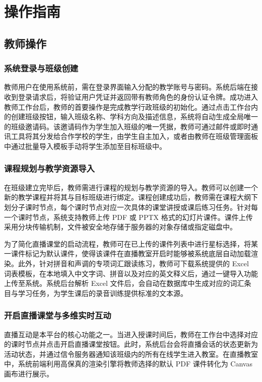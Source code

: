 \chapter{操作指南}

\section{教师操作}

\subsection{系统登录与班级创建}

教师用户在使用系统前，需在登录界面输入分配的教学账号与密码。系统后端在接收到登录请求后，将验证用户凭证并返回带有教师角色的身份认证令牌。成功进入教师工作台后，教师的首要操作是完成教学行政班级的初始化。通过点击工作台内的创建班级按钮，输入班级名称、学科方向及描述信息，系统将自动生成全局唯一的班级邀请码。该邀请码作为学生加入班级的唯一凭据，教师可通过邮件或即时通讯工具将其分发给合作学校的学生，由学生自主加入，或者由教师在班级管理面板中通过批量导入模板手动将学生添加至目标班级中。

\subsection{课程规划与教学资源导入}

在班级建立完毕后，教师需进行课程的规划与教学资源的导入。教师可以创建一个新的教学课程并将其与目标班级进行绑定。课程创建成功后，教师需在课程大纲下划分子课时节点，每个课时节点对应一次具体的课堂讲授或课后练习任务。针对每一个课时节点，系统支持教师上传 PDF 或 PPTX 格式的幻灯片课件。课件上传采用分块传输机制，文件被安全地存储于服务器的对象存储或指定磁盘中。

为了简化直播课堂的启动流程，教师可在已上传的课件列表中进行星标选择，将某一课件标记为默认课件，使得该课件在直播教室开启时能够被系统底层自动加载渲染。此外，针对拼音和声调的专项词汇跟读练习，教师可下载系统提供的 Excel 词表模板，在本地填入中文字词、拼音以及对应的英文释义后，通过一键导入功能上传至系统。系统后台解析 Excel 文件后，会自动在数据库中生成对应的词汇条目与学习任务，为学生课后的录音训练提供标准的文本源。

\subsection{开启直播课堂与多维实时互动}

直播互动是本平台的核心功能之一。当进入授课时间后，教师在工作台中选择对应的课时节点并点击开启直播课堂按钮。此时，系统后台会将直播会话的状态更新为活动状态，并通过信令服务器通知该班级内的所有在线学生进入教室。在直播教室中，系统前端利用高保真的渲染引擎将教师选择的默认 PDF 课件转化为 Canvas 画布进行展示。

